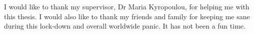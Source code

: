 \begin{acknowledgements}
I would like to thank my supervisor, Dr Maria Kyropoulou, for helping me with this thesis. I would also like to thank my friends and family for keeping me sane during this lock-down and overall worldwide panic. It has not been a fun time.
\end{acknowledgements}